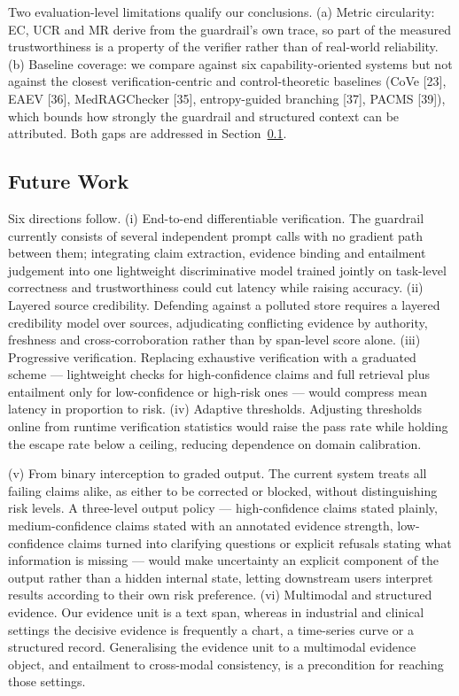 \documentclass[journal,10pt,a4paper]{IEEEtran}
\begin{document}
Two evaluation-level limitations qualify our conclusions. (a) Metric circularity: EC, UCR and MR derive from the guardrail's own trace, so part of the measured trustworthiness is a property of the verifier rather than of real-world reliability. (b) Baseline coverage: we compare against six capability-oriented systems but not against the closest verification-centric and control-theoretic baselines (CoVe [23], EAEV [36], MedRAGChecker [35], entropy-guided branching [37], PACMS [39]), which bounds how strongly the guardrail and structured context can be attributed. Both gaps are addressed in Section~\ref{sec:future}.

\subsection{Future Work}
\label{sec:future}
Six directions follow. (i) End-to-end differentiable verification. The guardrail currently consists of several independent prompt calls with no gradient path between them; integrating claim extraction, evidence binding and entailment judgement into one lightweight discriminative model trained jointly on task-level correctness and trustworthiness could cut latency while raising accuracy. (ii) Layered source credibility. Defending against a polluted store requires a layered credibility model over sources, adjudicating conflicting evidence by authority, freshness and cross-corroboration rather than by span-level score alone. (iii) Progressive verification. Replacing exhaustive verification with a graduated scheme --- lightweight checks for high-confidence claims and full retrieval plus entailment only for low-confidence or high-risk ones --- would compress mean latency in proportion to risk. (iv) Adaptive thresholds. Adjusting thresholds online from runtime verification statistics would raise the pass rate while holding the escape rate below a ceiling, reducing dependence on domain calibration.

(v) From binary interception to graded output. The current system treats all failing claims alike, as either to be corrected or blocked, without distinguishing risk levels. A three-level output policy --- high-confidence claims stated plainly, medium-confidence claims stated with an annotated evidence strength, low-confidence claims turned into clarifying questions or explicit refusals stating what information is missing --- would make uncertainty an explicit component of the output rather than a hidden internal state, letting downstream users interpret results according to their own risk preference. (vi) Multimodal and structured evidence. Our evidence unit is a text span, whereas in industrial and clinical settings the decisive evidence is frequently a chart, a time-series curve or a structured record. Generalising the evidence unit to a multimodal evidence object, and entailment to cross-modal consistency, is a precondition for reaching those settings.
\end{document}
